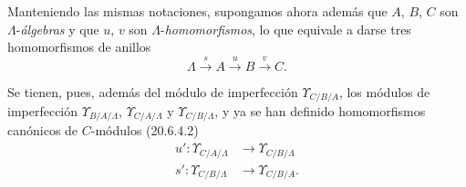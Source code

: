 \begin{env}[20.6.14]
\label{0.20.6.14-fr}
Manteniendo las mismas notaciones, supongamos ahora además que $A$,
$B$, $C$ son $\Lambda$-\emph{álgebras} y que $u$, $v$ son
$\Lambda$-\emph{homomorfismos}, lo que equivale a darse tres homomorfismos
de anillos
\[
  \Lambda\xrightarrow{s}A\xrightarrow{u}B\xrightarrow{v}C.
\]

Se tienen, pues, además del módulo de imperfección $\Upsilon_{C/B/A}$, los
módulos de imperfección $\Upsilon_{B/A/\Lambda}$,
$\Upsilon_{C/A/\Lambda}$ y $\Upsilon_{C/B/\Lambda}$, y ya se han definido
homomorfismos canónicos de $C$-módulos (20.6.4.2)
\begin{align}
\tag{20.6.14.1}
\label{0.20.6.14.1-fr}
  u':\Upsilon_{C/A/\Lambda}&\longrightarrow\Upsilon_{C/B/\Lambda}\\
\tag{20.6.14.2}
\label{0.20.6.14.2-fr}
  s':\Upsilon_{C/B/\Lambda}&\longrightarrow\Upsilon_{C/B/A}.
\end{align}


\end{env}
